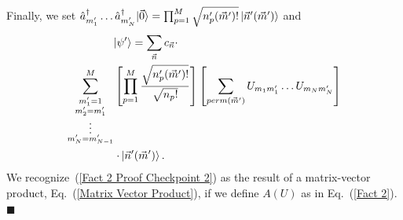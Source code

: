 \documentclass[aps,pra,twocolumn,showpacs,superscriptaddress,floatfix,10pt]{revtex4}
\begin{document}
Finally, we set $\hat{a}_{m_1^\prime}^\dagger \dots \hat{a}_{m_N^\prime}^\dagger |\vec{0} \rangle =  \prod_{p=1}^{M} \sqrt{ n_p^\prime(\vec{m}^\prime)! } \ket{\vec{n}^\prime(\vec{m}^\prime)} $ and
\begin{eqnarray}
\label{Fact 2 Proof Checkpoint 2}
\small \ket{\psi^\prime} = \sum_{\vec{n}} c_{\vec{n}}  \cdot \quad \quad \quad \quad \quad \quad \quad \quad \quad \quad \quad \quad \quad \quad \quad \quad  \\ \sum^M_{\substack{m_1^\prime = 1\\
		m_2^\prime = m_1^\prime\\
		\vdots \\
		m_N^\prime = m_{N-1}^\prime}}
\left[ \prod_{p=1}^{M} \frac{\sqrt{n_p^\prime(\vec{m}^\prime) !}}{ \sqrt{n_p !}} \right] \left[ \sum_{perm(\vec{m}^\prime)} U_{m_1 m_1^\prime} \dots U_{m_N m_N^\prime} \right] \nonumber \\
\cdot \ket{\vec{n}^\prime (\vec{m}^\prime) } . \quad \quad \quad \quad \quad \quad \quad \quad \quad \quad \quad \quad \quad \quad \quad \quad \nonumber
\end{eqnarray}
We recognize~(\ref{Fact 2 Proof Checkpoint 2}) as the result of a matrix-vector product, Eq.~(\ref{Matrix Vector Product}), if we define $A(U)$ as in Eq.~(\ref{Fact 2}).  $ \blacksquare $
\end{document}
